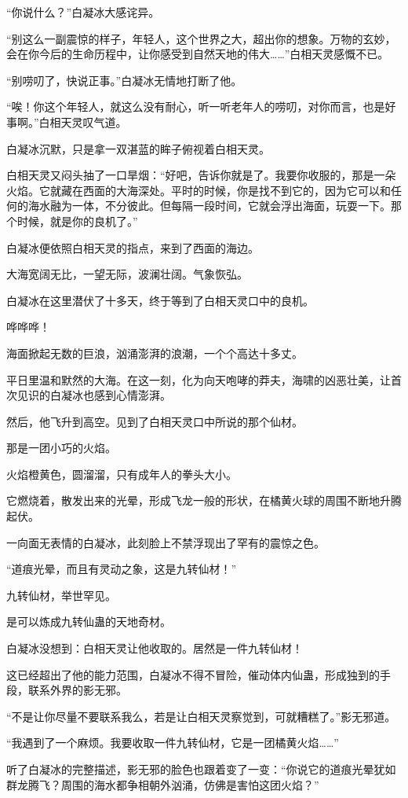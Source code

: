 \begin{this_body}
“你说什么？”白凝冰大感诧异。

“别这么一副震惊的样子，年轻人，这个世界之大，超出你的想象。万物的玄妙，会在你今后的生命历程中，让你感受到自然天地的伟大……”白相天灵感慨不已。

“别唠叨了，快说正事。”白凝冰无情地打断了他。

“唉！你这个年轻人，就这么没有耐心，听一听老年人的唠叨，对你而言，也是好事啊。”白相天灵叹气道。

白凝冰沉默，只是拿一双湛蓝的眸子俯视着白相天灵。

白相天灵又闷头抽了一口旱烟：“好吧，告诉你就是了。我要你收服的，那是一朵火焰。它就藏在西面的大海深处。平时的时候，你是找不到它的，因为它可以和任何的海水融为一体，不分彼此。但每隔一段时间，它就会浮出海面，玩耍一下。那个时候，就是你的良机了。”

白凝冰便依照白相天灵的指点，来到了西面的海边。

大海宽阔无比，一望无际，波澜壮阔。气象恢弘。

白凝冰在这里潜伏了十多天，终于等到了白相天灵口中的良机。

哗哗哗！

海面掀起无数的巨浪，汹涌澎湃的浪潮，一个个高达十多丈。

平日里温和默然的大海。在这一刻，化为向天咆哮的莽夫，海啸的凶恶壮美，让首次见识的白凝冰也感到心情澎湃。

然后，他飞升到高空。见到了白相天灵口中所说的那个仙材。

那是一团小巧的火焰。

火焰橙黄色，圆溜溜，只有成年人的拳头大小。

它燃烧着，散发出来的光晕，形成飞龙一般的形状，在橘黄火球的周围不断地升腾起伏。

一向面无表情的白凝冰，此刻脸上不禁浮现出了罕有的震惊之色。

“道痕光晕，而且有灵动之象，这是九转仙材！”

九转仙材，举世罕见。

是可以炼成九转仙蛊的天地奇材。

白凝冰没想到：白相天灵让他收取的。居然是一件九转仙材！

这已经超出了他的能力范围，白凝冰不得不冒险，催动体内仙蛊，形成独到的手段，联系外界的影无邪。

“不是让你尽量不要联系我么，若是让白相天灵察觉到，可就糟糕了。”影无邪道。

“我遇到了一个麻烦。我要收取一件九转仙材，它是一团橘黄火焰……”

听了白凝冰的完整描述，影无邪的脸色也跟着变了一变：“你说它的道痕光晕犹如群龙腾飞？周围的海水都争相朝外汹涌，仿佛是害怕这团火焰？”


\end{this_body}
